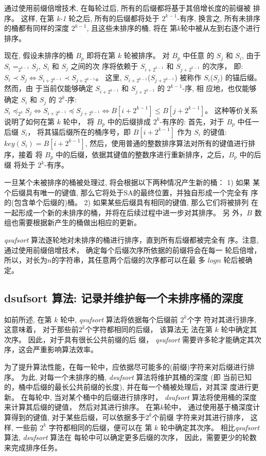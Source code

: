 通过使用前缀倍增技术, 在每轮过后, 所有的后缀都将基于其倍增长度的前缀被
排序。 这样, 在第 \emph{k-1} 轮之后, 所有的后缀都将处于 $2^{k-1}$-有序,
换言之, 所有未排序的桶都有同样的深度 $2^{k-1}$, 且这些未排序的桶, 将在
第$k$轮中被从左到右逐个进行排序。

现在, 假设未排序的桶 $B_p$ 即将在第 $k$ 轮被排序。 对 $B_p$ 中任意
的 $S_j$ 和 $S_i$, 由于 $S_i =_{2^{k-1}} S_j$, $S_i$ 和 $S_j$ 之间的次
序将依赖于 $S_{i+2^{k-1}}$ 和 $S_{j+2^{k-1}}$ 的次序， 即:
$S_i \prec S_j \iff S_{i+2^{k-1}} \prec S_{j+2^{k-1}}$。 这里,
$S_{i+2^{k-1}}$($S_{j+2^{k-1}}$) 被称作 $S_i$($S_j$) 的锚后缀。 然而，由
于当前仅能够确定 $S_{i+2^{k-1}}$ 和 $S_{j+2^{k-1}}$ 的 $2^{k-1}$-序, 相
应地，也仅能够确定 $S_i$ 和 $S_j$ 的 $2^k$-序:
$S_i \preceq_{2^k} S_j \iff S_{i+2^{k-1}} \preceq S_{j+2^{k-1}} \iff
B[i+2^{k-1}] \leq B[j+2^{k-1}]$。  这种等价关系说明了如何在第 $k$ 轮中，
将 $B_p$ 中的后缀排成 $2^k$-有序的: 首先，对于 $B_p$ 中任一后缀 $S_i$，
将其锚后缀所在的桶序号，即 $B[i+2^{k-1}]$ 作为 $S_i$ 的键值: $key(S_i)
= B[i+2^{k-1}]$, 然后，使用普通的整数排序算法对所有的键值进行排序，接着
将 $B_p$ 中的后缀，依据其键值的整数序进行重新排序，之后，$B_p$ 中的后缀
将处于 $2^k$-有序。

一旦某个未被排序的桶被处理过, 将会根据以下两种情况产生新的桶： 1) 如果
某个后缀具有唯一的键值, 那么它将处于SA的最终位置，并独自形成一个完全有
序的(包含单个后缀的)桶。 2) 如果某些后缀具有相同的键值, 那么它们将被排列
在一起形成一个新的未排序的桶，并将在后续过程中进一步对其排序。 另
外，$B$ 数组也需要根据新产生的桶做出相应的更新。

\emph{qsufsort} 算法逐轮地对未排序的桶进行排序，直到所有后缀都被完全有
序。注意, 通过使用前缀倍增技术， 确定每个后缀次序所依据的前缀将会在每一
轮后倍增，所以，对长为$n$的字符串，其任意两个后缀的次序都可以在最
多 $logn$ 轮后被确定。

\subsection{dsufsort 算法: 记录并维护每一个未排序桶的深度}
\label{sec:dsufsort}

如前所述, 在第 $k$ 轮中, \emph{qsufsort} 算法将依据每个后缀前 $2^k$个字
符对其进行排序, 这意味着， 对于那些前$2^k$个字符都相同的后缀， 该算法无
法在第 $k$ 轮中确定其次序。 因此，对于具有很长公共前缀的后
缀， \emph{qsufsort} 需要许多轮才能确定其次序，这会严重影响算法效率。

为了提升算法性能，在每一轮中，应依据尽可能多的(前缀)字符来对后缀进行排
序。 为此, 对每一个未排序的桶, \emph{dsufsort} 算法将维护其桶的深度 (即
当前已知的，桶中后缀的最长公共前缀的长度), 并在每一个桶被处理后，对其深
度进行更新。 在每轮中, 当对某个桶中的后缀进行排序时， \emph{dsufsort}
算法将使用桶的深度来计算其后缀的键值， 然后对其进行排序。 在第$k$轮中，
通过使用基于桶深度计算得到的键值, 对于某些后缀，可以依据多于$2^k$个前缀
字符来对其进行排序， 这样, 一些前 $2^k$ 字符都相同的后缀，便可以在
第 $k$ 轮中确定其次序。 相比\emph{qsufsort}算法, \emph{dsufsort} 算法在
每轮中可以确定更多后缀的次序， 因此，需要更少的轮数来完成排序任务。

